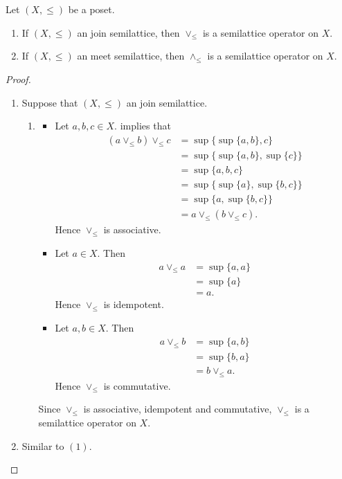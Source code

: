 \documentclass{book}
\begin{document}
	\begin{ex} 
		Let $(X, \leq)$ be a poset.
		\begin{enumerate}
			\item If $(X, \leq)$ an join semilattice, then $\vee_{\leq}$ is a semilattice operator on $X$.
			\item If $(X, \leq)$ an meet semilattice, then $\wedge_{\leq}$ is a semilattice operator on $X$.
		\end{enumerate}
	\end{ex}
	
	\begin{proof}\
		\begin{enumerate}
			\item Suppose that $(X, \leq)$ an join semilattice. 
			\begin{enumerate}
				\item \begin{itemize}
					\item Let $a,b,c \in X$.  implies that
					\begin{align*}
						(a\vee_{\leq}b) \vee_{\leq} c
						& = \sup \{\sup \{a, b\}, c\} \\
						& = \sup \{\sup \{a, b\}, \sup \{c\} \} \\
						& = \sup \{a, b, c\} \\
						& = \sup \{\sup \{a \}, \sup \{b, c\} \} \\
						& = \sup \{a, \sup \{b, c\} \} \\
						& = a \vee_{\leq} (b \vee_{\leq} c).
					\end{align*}
					Hence $\vee_{\leq}$ is associative.
					\item Let $a \in X$. Then 
					\begin{align*}
						a \vee_{\leq} a
						& = \sup \{a, a\} \\
						& = \sup \{a\} \\
						& = a.
					\end{align*}
					Hence $\vee_{\leq}$ is idempotent.
					\item Let $a,b \in X$. Then 
					\begin{align*}
						a \vee_{\leq} b
						& = \sup \{a, b\} \\
						& = \sup \{b, a\} \\
						& = b \vee_{\leq} a.
					\end{align*}
					Hence $\vee_{\leq}$ is commutative.
				\end{itemize}
				Since $\vee_{\leq}$ is associative, idempotent and commutative, $\vee_{\leq}$ is a semilattice operator on $X$.
			\end{enumerate}
			\item Similar to $(1)$.
		\end{enumerate}
	\end{proof}
	
\end{document}
